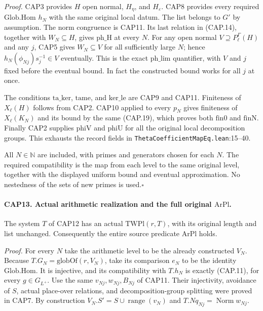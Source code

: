 \emph{Proof.}
CAP3 provides $H$ open normal, $H_\eta$, and $H_\varepsilon$.
CAP8 provides every required $\mathrm{Glob.Hom}$ $h_N$ with the
same original local datum.  The list belongs to $G'$ by assumption.
The norm congruence is CAP11.  Its last relation in (CAP.14), together
with $W_N\subseteq H$, gives $\mathrm{ph\_H}$ at every $N$.
For any open normal $V\supseteq P_\ell^\Gamma(H)$ and any $j$,
CAP5 gives $W_N\subseteq V$ for all sufficiently large $N$; hence
$h_N(\phi_{Nj})s_j^{-1}\in V$ eventually.  This is the exact
$\mathrm{ph\_lim}$ quantifier, with $V$ and $j$ fixed before the
eventual bound.  In fact the constructed bound works for all $j$
at once.

The conditions $\mathrm{ta\_ker}$, $\mathrm{tame}$, and
$\mathrm{ker\_le}$ are CAP9 and CAP11.  Finiteness of $X_\ell(H)$
follows from CAP2.  CAP10 applied to every $p_N$ gives finiteness
of $X_\ell(K_N)$ and its bound by the same (CAP.19), which proves
both $\mathrm{fin0}$ and $\mathrm{finN}$.  Finally CAP2 supplies
$\mathrm{phiV}$ and $\mathrm{phiU}$ for all the original local
decomposition groups.  This exhausts the record fields in
\nolinkurl{ThetaCoefficientMapEq.lean}:15--40.

All $N\in\mathbb N$ are included, with primes and generators
chosen for each $N$.  The required compatibility is the map from
each level to the same original level, together with the displayed
uniform bound and eventual approximation.  No nestedness of the
sets of new primes is used.\hfill$\square$

\paragraph{CAP13. Actual arithmetic realization and the full original $\mathrm{ArPl}$.}
\label{claim:CAP13}
The system $T$ of CAP12 has an actual $\mathrm{TWPl}(r,T)$,
with its original length and list unchanged.  Consequently the entire
source predicate $\mathrm{ArPl}$ holds.

\emph{Proof.}
For every $N$ take the arithmetic level to be the already constructed
$V_N$.  Because $T.G_N=\mathrm{globOf}(r,V_N)$, take its comparison
$e_N$ to be the identity $\mathrm{Glob.Hom}$.  It is injective, and
its compatibility with $T.h_N$ is exactly (CAP.11), for every
$g\in G_{L^+}$.
Use the same $v_{Nj},w_{Nj},B_{Nj}$ of CAP11.  Their injectivity,
avoidance of $S$, actual place-over relations, and decomposition-group
splitting were proved in CAP7.  By construction
$V_N.S'=S\cup\operatorname{range}(v_N)$ and
$T.Nq_{Nj}=\operatorname{Norm}w_{Nj}$.

